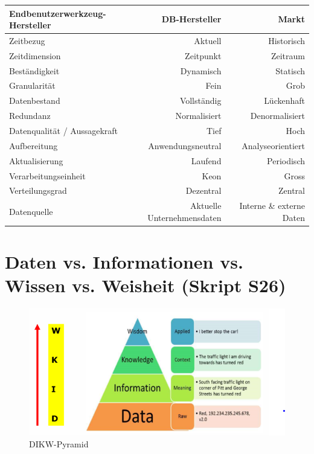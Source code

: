 \documentclass[a4paper, 11pt, nofootinbib]{article}
\begin{document}
\begin{landscape}
\begin{tabular}[htbp]{|l|r|r|}
		\hline
		Endbenutzerwerkzeug-Hersteller & DB-Hersteller & Markt \\
		\hline
		Zeitbezug & Aktuell & Historisch \\ 
		\hline
		Zeitdimension & Zeitpunkt & Zeitraum \\
		\hline
		Beständigkeit & Dynamisch & Statisch \\
		\hline
		Granularität & Fein & Grob \\
		\hline
		Datenbestand & Vollständig & Lückenhaft \\
		\hline
		Redundanz & Normalisiert & Denormalisiert \\
		\hline
		Datenqualität / Aussagekraft & Tief & Hoch \\
		\hline
		Aufbereitung & Anwendungsneutral & Analyseorientiert \\
		\hline
		Aktualisierung & Laufend & Periodisch \\
		\hline
		Verarbeitungseinheit & Keon & Gross \\
		\hline
		Verteilungsgrad & Dezentral & Zentral \\
		\hline
		Datenquelle & Aktuelle Unternehmensdaten & Interne \& externe Daten \\
		\hline
	\end{tabular} 
	\end{landscape}

\restoregeometry

\section{Daten vs. Informationen vs. Wissen vs. Weisheit (Skript S26)}

\begin{figure}[htb]
	\centering
	\includegraphics[keepaspectratio=true,height=15\baselineskip]{DIWW.PNG}
	\caption{DIKW-Pyramid}
	\label{fig:dikw}
\end{figure}
\end{document}
